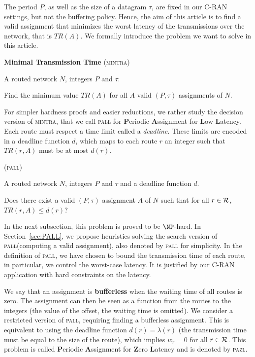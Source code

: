 \documentclass[a4paper,10pt]{journal}
\newcommand\pazl{\textsc{pazl}\xspace}
\newcommand\pall{\textsc{pall}\xspace}
\newcommand\mintra{\textsc{mintra}\xspace}
\begin{document}
      The period $P$, as well as the size of a datagram $\tau$, are fixed in our C-RAN settings, but not the buffering policy. Hence, the aim of this article is to find a valid assignment that minimizes the worst latency of the transmissions over the network, that is $TR(A)$. We formally introduce the problem we want to solve in this article. 

      \bigskip

      \noindent \textbf{Minimal Transmission Time }(\mintra)

       A routed network $N$, integers $P$ and $\tau$.
      
       Find the minimum value $TR(A)$ for all $A$ valid $(P,\tau)$ assignments of $N$. 
      \bigskip

      For simpler hardness proofs and easier reductions, we rather study the decision version of \mintra, that we call \pall for \textbf{P}eriodic \textbf{A}ssignment for \textbf{L}ow \textbf{L}atency. Each route must respect a time limit called a \emph{deadline}. These limits are encoded in a deadline function $d$, which maps to each route $r$ an integer such that $TR(r,A)$ must be at most $d(r)$.
      

      \bigskip

       (\pall)

        A routed network $N$, integers $P$ and $\tau$ and a deadline function $d$.
      
       Does there exist a valid $(P,\tau)$ assignment $A$ of $N$ such that for all $r \in {\cal R}$, $TR(r,A) \leq d(r)$?
      \bigskip

In the next subsection, this problem is proved to be $\NP$-hard. In Section~\ref{sec:PALL}, we propose heuristics solving the search version of \pall (computing a valid assignment), also denoted by \pall for simplicity. In the definition of \pall, we have chosen to bound the transmission time of each route, in particular, we control the worst-case latency. It is justified by our C-RAN application with hard constraints on the latency.

We say that an assignment is \textbf{bufferless} when the waiting time of all routes is zero.
The assignment can then be seen as a function from the routes to the integers (the value of the offset, the waiting time is omitted). We consider a restricted version of \pall, requiring finding a bufferless assignment. This is equivalent to using the deadline function $d(r) = \lambda(r)$ (the transmission time must be equal to the size of the route), which implies $w_r = 0$ for all $r \in \cal{R}$. This problem is called \textbf{P}eriodic \textbf{A}ssignment for \textbf{Z}ero \textbf{L}atency and is denoted by \pazl.
\end{document}
